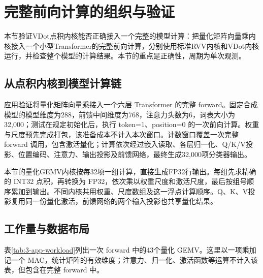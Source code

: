 

\section{完整前向计算的组织与验证}\label{sec:3-forward}
本节验证VDot点积内核能否正确接入一个完整的模型计算：把量化矩阵向量乘内核接入一个小型Transformer的完整前向计算，分别使用标准RVV内核和VDot内核运行，并检查整个模型的计算结果。本节的重点是正确性，周期为单次观测。

\subsection{从点积内核到模型计算链}

应用验证将量化矩阵向量乘接入一个六层 Transformer 的完整 forward。固定合成模型的模型维度为288，前馈中间维度为768，注意力头数为6，词表大小为32,000；测试在规定初始化后，执行 token=1、position=0 的一次前向计算。权重与尺度预先完成打包，该准备成本不计入本次窗口。计数窗口覆盖一次完整 forward 调用，包含激活量化；计算依次经过嵌入读取、各层归一化、Q/K/V投影、位置编码、注意力、输出投影及前馈网络，最终生成32,000项分类器输出。

本节的量化GEMV内核按每32项一组计算，直接生成FP32行输出。每组先求精确的 INT32 点积，再转换为 FP32，依次乘以权重尺度和激活尺度，最后按组号顺序累加到输出。不同内核共用权重、尺度数组及这一浮点计算顺序。Q、K、V投影复用同一份量化激活，前馈网络的两个输入投影也共享量化结果。

\subsection{工作量与数据布局}

表\ref{tab:3-app-workload}列出一次 forward 中的43个量化 GEMV。这里以一项乘加记一个 MAC，统计矩阵的有效维度；注意力、归一化、激活函数等运算不计入该表，但包含在完整 forward 中。

